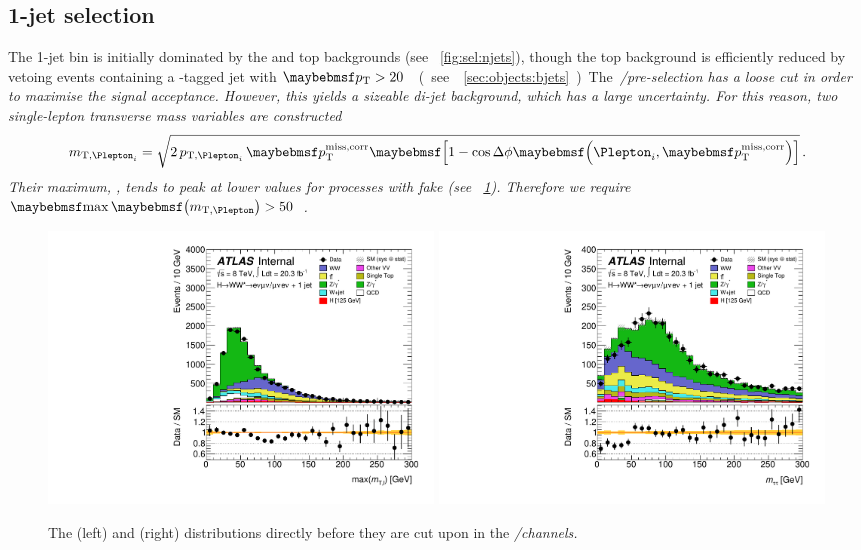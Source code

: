 \subsection{1-jet selection}
\label{sec:selection:1j}

The 1-jet bin is initially dominated by the \DY and top backgrounds (see 
\Figure~\ref{fig:sel:njets}), though the top background is efficiently reduced by vetoing 
events containing a \Pbottom-tagged jet with \unit{$\pt > 20$}{\GeV} (see 
\Section~\ref{sec:objects:bjets}).

The \em/\me pre-selection has a loose \corrtrackmet cut in order to maximise the 
signal acceptance. However, this yields a sizeable di-jet background, which has a large 
uncertainty. For this reason, two single-lepton transverse mass variables are constructed
\begin{equation}
	m_{\text{T,}\Plepton_i} = \sqrt{2 \, p_{\text{T,}\Plepton_i} \, \corrtrackmet 
	\sqbracs{1 - \cos\Delta\phi\parenths{\Plepton_i, \corrtrackmet}}} \,.
\end{equation}
Their maximum, \maxmtw, tends to peak at lower values for processes with fake \met (see 
\Figure~\ref{fig:sel:1j:df_cuts}). Therefore we require \unit{$\maxmtw > 50$}{\GeV}.

\begin{figure}
	\includegraphics[width=0.495\textwidth]{tex/selection/emme_CutbVeto_1jet_MaxMTW_TrackHWW_Clj_mh125_lin}
	\hfill
	\includegraphics[width=0.495\textwidth]{tex/selection/emme_CutMaxMTlep_1jet_Mtt_TrackHWW_Clj_mh125_lin}
	\caption{The \maxmtw (left) and \mtautau (right) distributions directly 
	before they are cut upon in the \em/\me channels.}
	\label{fig:sel:1j:df_cuts}
\end{figure}

